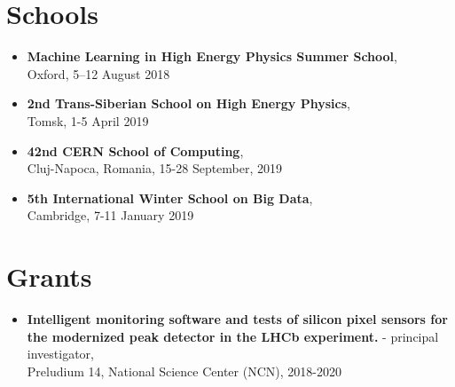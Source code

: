 \section*{Schools}
\begin{itemize}
    \item \textbf{Machine Learning in High Energy Physics Summer School},\\ Oxford, 5–12 August 2018
    \item \textbf{2nd Trans-Siberian School on High Energy Physics},\\ Tomsk, 1-5 April 2019
    \item \textbf{42nd CERN School of Computing},\\ Cluj-Napoca, Romania, 15-28 September, 2019
    \item \textbf{5th International Winter School on Big Data},\\ Cambridge, 7-11 January 2019
\end{itemize}

\section*{Grants}
\begin{itemize}
    \item \textbf{Intelligent monitoring software and tests of silicon pixel sensors for the modernized peak detector in the LHCb experiment.} - principal investigator,\\ Preludium 14, National Science Center (NCN), 2018-2020
\end{itemize}

